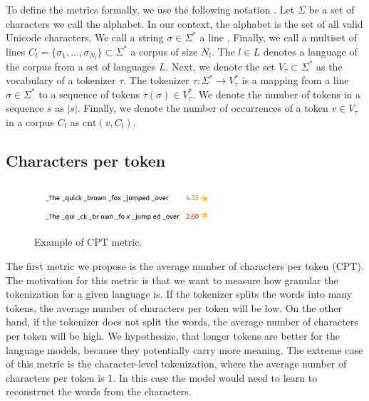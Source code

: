 To define the metrics formally, we use the following notation \cite{zouhar_tokenization_2023}. Let $\Sigma$ be a set of characters we call the alphabet. In our context, the alphabet is the set of all valid Unicode characters. We call a string $\sigma \in \Sigma^*$ a line . Finally, we call a multiset of lines $C_l = \{ \sigma_1, \ldots, \sigma_{N_l} \} \subset \Sigma^*$ a corpus of size $N_l$. The $l \in L$ denotes a language of the corpus from a set of languages $L$. Next, we denote the set $V_\tau \subset \Sigma^*$ as the vocabulary of a tokenizer $\tau$. The tokenizer $\tau: \Sigma^* \rightarrow V_\tau^*$ is a mapping from a line $\sigma \in \Sigma^*$ to a sequence of tokens $\tau(\sigma) \in V_\tau^*$. We denote the number of tokens in a sequence $s$ as $|s|$. Finally, we denote the number of occurrences of a token $v \in V_\tau$ in a corpus $C_l$ as $\textrm{cnt}(v, C_l)$.


\subsection{Characters per token}

\begin{figure}[h]
    \centering
    \includegraphics[width=0.6\textwidth]{img/temp/cpt_example.png}
    \caption{Example of CPT metric.}
    \label{fig:cpt_example}
\end{figure}

The first metric we propose is the average number of characters per token (CPT). The motivation for this metric is that we want to measure how granular the tokenization for a given language is. If the tokenizer splits the words into many tokens, the average number of characters per token will be low. On the other hand, if the tokenizer does not split the words, the average number of characters per token will be high. We hypothesize, that longer tokens are better for the language models, because they potentially carry more meaning. The extreme case of this metric is the character-level tokenization, where the average number of characters per token is 1. In this case the model would need to learn to reconstruct the words from the characters.

